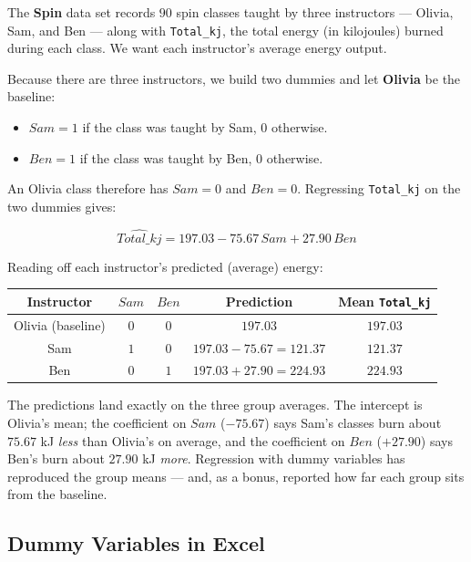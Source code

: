 \documentclass[
  11pt,
  letterpaper,
  DIV=11,
  numbers=noendperiod,
  oneside,
  open=any]{scrreprt}
\providecommand{\tightlist}{%
  \setlength{\itemsep}{0pt}\setlength{\parskip}{0pt}}\usepackage{longtable,booktabs,array}
\begin{document}
\begin{bsexample}[Example]

The \textbf{Spin} data set records \(90\) spin classes taught by three
instructors --- Olivia, Sam, and Ben --- along with \texttt{Total\_kj},
the total energy (in kilojoules) burned during each class. We want each
instructor's average energy output.

Because there are three instructors, we build two dummies and let
\textbf{Olivia} be the baseline:

\begin{itemize}
\tightlist
\item
  \(Sam = 1\) if the class was taught by Sam, \(0\) otherwise.
\item
  \(Ben = 1\) if the class was taught by Ben, \(0\) otherwise.
\end{itemize}

An Olivia class therefore has \(Sam=0\) and \(Ben=0\). Regressing
\texttt{Total\_kj} on the two dummies gives:

\[\widehat{Total\_kj}=197.03-75.67\,Sam+27.90\,Ben\]

Reading off each instructor's predicted (average) energy:

\begin{center}
\begin{tabular}{ccccc}
\toprule
Instructor & \(Sam\) & \(Ben\) & Prediction & Mean \texttt{Total\_kj} \\
\midrule
Olivia (baseline) & \(0\) & \(0\) & \(197.03\) & \(197.03\) \\
Sam & \(1\) & \(0\) & \(197.03-75.67=121.37\) & \(121.37\) \\
Ben & \(0\) & \(1\) & \(197.03+27.90=224.93\) & \(224.93\) \\
\bottomrule
\end{tabular}
\end{center}

The predictions land exactly on the three group averages. The intercept
is Olivia's mean; the coefficient on \(Sam\) (\(-75.67\)) says Sam's
classes burn about \(75.67\) kJ \emph{less} than Olivia's on average,
and the coefficient on \(Ben\) (\(+27.90\)) says Ben's burn about
\(27.90\) kJ \emph{more}. Regression with dummy variables has reproduced
the group means --- and, as a bonus, reported how far each group sits
from the baseline.

\end{bsexample}

\subsection*{Dummy Variables in Excel}\label{dummy-variables-in-excel}
\end{document}
